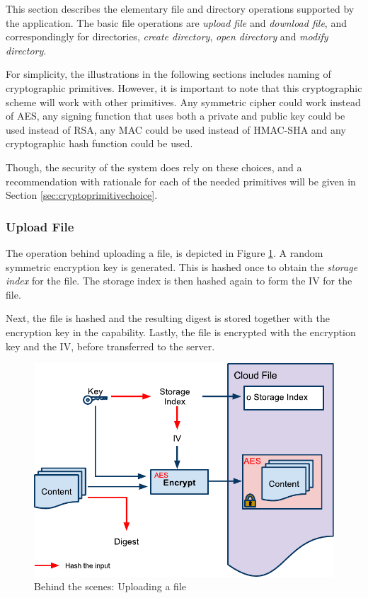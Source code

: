 \documentclass[pdftex,english,10pt,b5paper,twoside]{book}
\begin{document}
This section describes the elementary file and directory operations supported
by the application. The basic file operations are \emph{upload file} and
\emph{download file}, and correspondingly for directories, \emph{create
directory}, \emph{open directory} and \emph{modify directory}.

For simplicity, the illustrations in the following sections includes naming of
cryptographic primitives. However, it is important to note that this
cryptographic scheme will work with other primitives. Any symmetric cipher
could work instead of \ac{AES}, any signing function that uses both a private
and public key could be used instead of \ac{RSA}, any \ac{MAC} could be used
instead of HMAC-\ac{SHA} and any cryptographic hash function could be used.

Though, the security of the system does rely on these choices, and a
recommendation with rationale for each of the needed primitives will be given
in Section \ref{sec:cryptoprimitivechoice}.

\subsubsection{Upload File}
\label{sec:CS:CF}

The operation behind uploading a file, is depicted in Figure \ref{fig:CS:CF}. A
random symmetric encryption key is generated. This is hashed once to obtain the
\emph{storage index} for the file. The storage index is then hashed again to
form the \ac{IV} for the file.

Next, the file is hashed and the resulting digest is stored together with the
encryption key in the capability. Lastly, the file is encrypted with the
encryption key and the \ac{IV}, before transferred to the server.

\begin{figure}[h!]
    \centering
    \includegraphics[width=\columnwidth]{CryptoCreateFile.pdf}
    \caption{Behind the scenes: Uploading a file}
    \label{fig:CS:CF}
\end{figure}
\end{document}
